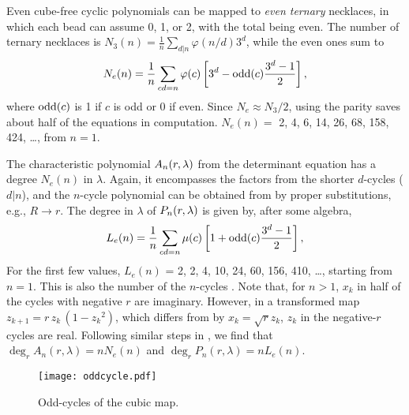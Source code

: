 \documentclass{ws-ijbc}
\begin{document}
Even cube-free cyclic polynomials
can be mapped to \emph{even ternary} necklaces,
in which each bead can assume
0, 1, or 2, with the total being even.
%
The number of ternary necklaces is
$N_3(n) = \frac{1}{n} \sum_{d|n} \varphi(n/d) 3^d$,
while the even ones sum to
\begin{equation}
  N_e(n) = \frac{1}{n} \sum_{c d = n} \varphi(c)
    \left[
      3^d - \mathrm{odd}(c) \frac{3^d-1}{2}
    \right],
\label{eq:cubnecklace}
\end{equation}
where
$\mathrm{odd}(c)$ %
is 1 if $c$ is odd or 0 if even.
%
Since $N_e \approx N_3/2$, using the parity saves about half of the equations
  in computation.
%
$N_e(n) =$ 2, 4, 6, 14, 26, 68, 158, 424, \dots, from $n = 1$.
%



The characteristic polynomial $A_n(r, \lambda)$
  from the determinant equation
  has a degree $N_e(n)$ in $\lambda$.
Again, it encompasses the factors
  from the shorter $d$-cycles ($d|n$),
  and the $n$-cycle polynomial can be obtained
  from  by proper substitutions, e.g.,
  $R\rightarrow r$.
The degree in $\lambda$ of $P_n(r, \lambda)$
  is given by, after some algebra,
%
%
\begin{equation}
  L_e(n) = \frac{1}{n} \sum_{cd = n} \mu(c)
    \left[
      1 + \mathrm{odd}(c)\frac{3^d-1}{2}
    \right],
\label{eq:cublyndon}
\end{equation}
%
%
For the first few values,
  $L_e(n)$ = 2, 2, 4, 10, 24, 60, 156, 410, \ldots, starting from $n = 1$.
%
This is also the number of the $n$-cycles \cite{hao, hao2}.
Note that, for $n>1$, $x_k$ in half of the cycles
  with negative $r$ are imaginary.
However, in a transformed map
$z_{k+1} = r \, z_k \, (1 - {z_k}^2)$,
which differs from  by $x_k = \sqrt{r} z_k$,
$z_k$ in the negative-$r$ cycles are real.
%
%
Following similar steps in ,
we find that
  $\deg_r A_n(r, \lambda) = n N_e(n)$
  and $\deg_r P_n(r, \lambda) = n L_e(n)$.




%
%
\begin{figure}[h]
  \begin{center}
  \begin{minipage}{\linewidth}
        \texttt{[image: oddcycle.pdf]}
  \end{minipage}%
  \end{center}
  \caption{\label{fig:oddcycle}
  Odd-cycles of the cubic map.}
\end{figure}
%
%
\end{document}
